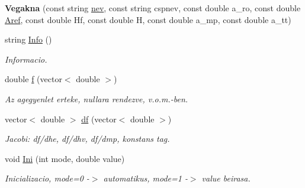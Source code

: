 \begin{DoxyCompactItemize}
\item 
\mbox{\label{class_vegakna_ae4041ee2a843f526bebded5f99ff2824}} 
{\bfseries Vegakna} (const string \hyperlink{class_agelem_abe92b7e3912367d5d1caf6b277ca0b7d}{nev}, const string cspnev, const double a\+\_\+ro, const double \hyperlink{class_agelem_a3f8668febc2958fd539997d537552f17}{Aref}, const double Hf, const double H, const double a\+\_\+mp, const double a\+\_\+tt)
\item 
\mbox{\label{class_vegakna_a9b47670176b3cff6d577e7a5b7ef7eb2}} 
string \hyperlink{class_vegakna_a9b47670176b3cff6d577e7a5b7ef7eb2}{Info} ()
\begin{DoxyCompactList}\small\item\em Informacio. \end{DoxyCompactList}\item 
\mbox{\label{class_vegakna_a1f4c98796c6ceb9fbdd935b20af6ab42}} 
double \hyperlink{class_vegakna_a1f4c98796c6ceb9fbdd935b20af6ab42}{f} (vector$<$ double $>$)
\begin{DoxyCompactList}\small\item\em Az agegyenlet erteke, nullara rendezve, v.\+o.\+m.-\/ben. \end{DoxyCompactList}\item 
\mbox{\label{class_vegakna_ac76d7d751b9dd9f28b5470ea68625345}} 
vector$<$ double $>$ \hyperlink{class_vegakna_ac76d7d751b9dd9f28b5470ea68625345}{df} (vector$<$ double $>$)
\begin{DoxyCompactList}\small\item\em Jacobi\+: df/dhe, df/dhv, df/dmp, konstans tag. \end{DoxyCompactList}\item 
\mbox{\label{class_vegakna_adaa3748adf56c35c7fb91d014eccb8fe}} 
void \hyperlink{class_vegakna_adaa3748adf56c35c7fb91d014eccb8fe}{Ini} (int mode, double value)
\begin{DoxyCompactList}\small\item\em Inicializacio, mode=0 -\/$>$ automatikus, mode=1 -\/$>$ value beirasa. \end{DoxyCompactList}\item 
\mbox{\label{class_vegakna_a6a5d3d90d5e0be90481bdd144c652208}} 

\end{DoxyCompactItemize}
